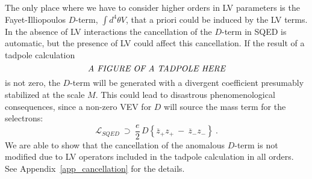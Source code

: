 \documentclass[paper,12pt]{revtex4}
\begin{document}
The only place where we have to consider higher orders in LV parameters
is the Fayet-Illiopoulos $D$-term, $\int d^4\theta V$, that a priori could be induced 
by the LV terms. In the absence of LV interactions the cancellation
of the $D$-term in SQED is automatic, but the presence of LV could 
affect this cancellation. If the result of a tadpole calculation
\begin{equation}
\label{tadpole}
	\emph{A FIGURE OF A TADPOLE HERE}
\end{equation}
	is not zero, the $ D $-term will be generated with a divergent coefficient 
    presumably stabilized at the scale $M$.	
	This could lead to disastrous phenomenological consequences, since a non-zero VEV for $ D $ 
	will source the mass term for the selectrons:
\begin{equation}
\nonumber
	\mathcal{L}_{SQED} ~\supset~ 
	\frac{e}
	     {2}\,
	D
	\left\{
		\overline{z}_+ z_+
		~-~
		\overline{z}_- z_-
	\right\}~.
\end{equation}
	 We are able to show that the cancellation 
of the anomalous $ D$-term is not modified due to
	LV operators included in the tadpole calculation in all orders.
	See Appendix~\ref{app_cancellation} for the details.
	
\end{document}
